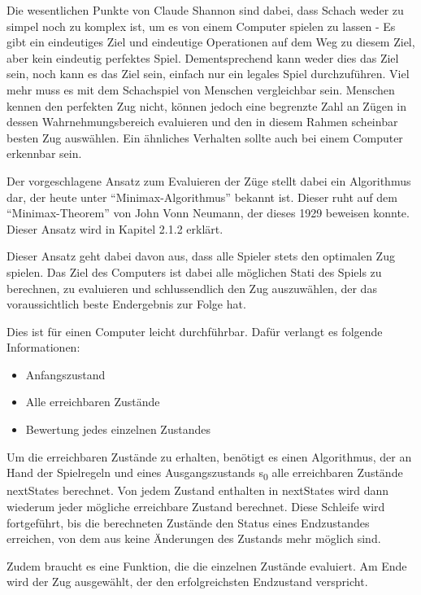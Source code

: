 Die wesentlichen Punkte von Claude Shannon sind dabei, dass Schach weder zu simpel noch zu komplex ist, um es von einem Computer spielen zu lassen - Es gibt ein eindeutiges Ziel und eindeutige Operationen auf dem Weg zu diesem Ziel, aber kein eindeutig perfektes Spiel. Dementsprechend kann weder dies das Ziel sein, noch kann es das Ziel sein, einfach nur ein legales Spiel durchzuführen. Viel mehr muss es mit dem Schachspiel von Menschen vergleichbar sein. Menschen kennen den perfekten Zug nicht, können jedoch eine begrenzte Zahl an Zügen in dessen Wahrnehmungsbereich evaluieren und den in diesem Rahmen scheinbar besten Zug auswählen. Ein ähnliches Verhalten sollte auch bei einem Computer erkennbar sein.

Der vorgeschlagene Ansatz zum Evaluieren der Züge stellt dabei ein Algorithmus dar, der heute unter ``Minimax-Algorithmus'' bekannt ist. Dieser ruht auf dem ``Minimax-Theorem''  von John Vonn Neumann, der dieses 1929 beweisen konnte. Dieser Ansatz wird in Kapitel 2.1.2 erklärt.

Dieser Ansatz geht dabei davon aus, dass alle Spieler stets den optimalen Zug spielen. Das Ziel des Computers ist dabei alle möglichen Stati des Spiels zu berechnen, zu evaluieren und schlussendlich den Zug auszuwählen, der das voraussichtlich beste Endergebnis zur Folge hat. 

Dies ist für einen Computer leicht durchführbar. Dafür verlangt es folgende Informationen:
\begin{itemize}
\item Anfangszustand
\item Alle erreichbaren Zustände
\item Bewertung jedes einzelnen Zustandes
\end{itemize}

Um die erreichbaren Zustände zu erhalten, benötigt es einen Algorithmus, der an Hand der Spielregeln und eines Ausgangszustands s\textsubscript{0} alle erreichbaren Zustände nextStates berechnet. Von jedem Zustand enthalten in nextStates wird dann wiederum jeder mögliche erreichbare Zustand berechnet. Diese Schleife wird fortgeführt, bis die berechneten Zustände den Status eines Endzustandes erreichen, von dem aus keine Änderungen des Zustands mehr möglich sind.

Zudem braucht es eine Funktion, die die einzelnen Zustände evaluiert. Am Ende wird der Zug ausgewählt, der den erfolgreichsten Endzustand verspricht.


